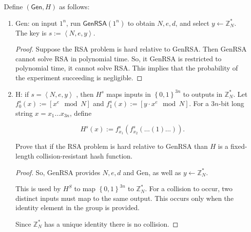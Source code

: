 \documentclass{article}
\begin{document}
\begin{enumerate}
    Define $(\textsf{Gen}, H)$ as follows:

    \begin{enumerate}
      \item \textsf{Gen}: on input $1^n$, run $\textsf{GenRSA}(1^n)$ to obtain
        $N, e, d$, and select $y \leftarrow \mathbb{Z}^{*}_N$. The key is $s := \left<N, e,
        y\right>$.

        \begin{proof}
          Suppose the RSA problem is hard relative to \textsf{GenRSA}. Then
          \textsf{GenRSA} cannot solve \textsf{RSA} in polynomial time. So, it
          \textsf{GenRSA} is restricted to polynomial time, it cannot solve
          \textsf{RSA}. This implies that the probability of the experiment
          succeeding is negligible.
        \end{proof}

      \item \textsf{H}: if $s = \left<N, e, y\right>$ , then $H^s$ maps inputs
        in $\left\{0, 1\right\}^{3n}$ to outputs in $\mathbb{Z}^{*}_N$. Let $f_0^s(x) :=
        [x^e \mod N]$ and $f_1^s(x) := [y \cdot x^e \mod N]$. For a $3n$-bit long
        string $x = x_1 \dots x_{3n}$, define

        \[
          H^s(x) := f_{x_1}^s(f_{x_2}^s(\dots(1)\dots)).
        \]

        Prove that if the RSA problem is hard relative to \textsf{GenRSA} than
        $H$ is a fixed-length collision-resistant hash function.

        \begin{proof}
          So, \textsf{GenRSA} provides $N, e, d$ and \textsf{Gen}, as well as $y
          \leftarrow \mathbb{Z}^{*}_{N}$.

          This is used by $H^S$ to map $\left\{0, 1\right\}^{3n}$ to
          $\mathbb{Z}^{*}_{N}$. For a collision to occur, two distinct inputs
          must map to the same output. This occurs only when the identity
          element in the group is provided.

          Since $\mathbb{Z}^{*}_N$ has a unique identity there is no collision.
        \end{proof}

    \end{enumerate}
\end{enumerate}
\end{document}
